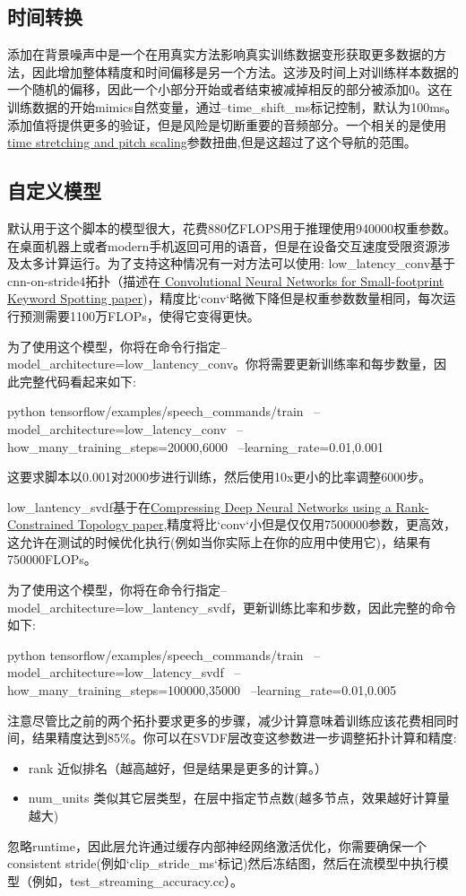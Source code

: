 \subsection{时间转换}
添加在背景噪声中是一个在用真实方法影响真实训练数据变形获取更多数据的方法，因此增加整体精度和时间偏移是另一个方法。这涉及时间上对训练样本数据的一个随机的偏移，因此一个小部分开始或者结束被减掉相反的部分被添加0。这在训练数据的开始mimics自然变量，通过--time\_shift\_ms标记控制，默认为100ms。添加值将提供更多的验证，但是风险是切断重要的音频部分。一个相关的是使用\href{https://en.wikipedia.org/wiki/Audio_time_stretching_and_pitch_scaling}{ time stretching and pitch scaling}参数扭曲,但是这超过了这个导航的范围。
\subsection{自定义模型}
默认用于这个脚本的模型很大，花费880亿FLOPS用于推理使用940000权重参数。在桌面机器上或者modern手机返回可用的语音，但是在设备交互速度受限资源涉及太多计算运行。为了支持这种情况有一对方法可以使用:
low\_latency\_conv基于cnn-on-stride4拓扑（描述在\href{http://www.isca-speech.org/archive/interspeech_2015/papers/i15_1478.pdf}{ Convolutional Neural Networks for Small-footprint Keyword Spotting paper})，精度比`conv`略微下降但是权重参数数量相同，每次运行预测需要1100万FLOPs，使得它变得更快。

为了使用这个模型，你将在命令行指定--model\_architecture=low\_lantency\_conv。你将需要更新训练率和每步数量，因此完整代码看起来如下:
\begin{bashcode}
python tensorflow/examples/speech_commands/train \
--model_architecture=low_latency_conv \
--how_many_training_steps=20000,6000 \
--learning_rate=0.01,0.001
\end{bashcode}
这要求脚本以0.001对2000步进行训练，然后使用10x更小的比率调整6000步。

low\_lantency\_svdf基于在\href{https://static.googleusercontent.com/media/research.google.com/en//pubs/archive/43813.pdf}{Compressing Deep Neural Networks using a Rank-Constrained Topology paper},精度将比`conv`小但是仅仅用7500000参数，更高效，这允许在测试的时候优化执行(例如当你实际上在你的应用中使用它)，结果有750000FLOPs。

为了使用这个模型，你将在命令行指定--model\_architecture=low\_lantency\_svdf，更新训练比率和步数，因此完整的命令如下:
\begin{bashcode}
python tensorflow/examples/speech_commands/train \
--model_architecture=low_latency_svdf \
--how_many_training_steps=100000,35000 \
--learning_rate=0.01,0.005
\end{bashcode}
注意尽管比之前的两个拓扑要求更多的步骤，减少计算意味着训练应该花费相同时间，结果精度达到85\%。你可以在SVDF层改变这参数进一步调整拓扑计算和精度:
\begin{itemize}
	\item rank 近似排名（越高越好，但是结果是更多的计算。）
	\item num\_units 类似其它层类型，在层中指定节点数(越多节点，效果越好计算量越大)
\end{itemize}
忽略runtime，因此层允许通过缓存内部神经网络激活优化，你需要确保一个consistent stride(例如`clip\_stride\_ms`标记)然后冻结图，然后在流模型中执行模型（例如，test\_streaming\_accuracy.cc）。

